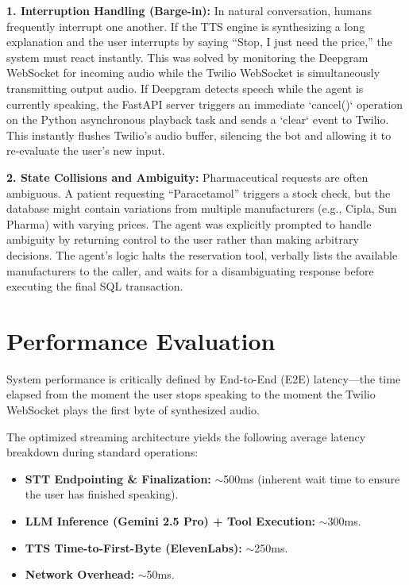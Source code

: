 \documentclass[conference,a4paper]{IEEEtran}
\begin{document}
\textbf{1. Interruption Handling (Barge-in):} In natural conversation, humans frequently interrupt one another. If the TTS engine is synthesizing a long explanation and the user interrupts by saying ``Stop, I just need the price,'' the system must react instantly. This was solved by monitoring the Deepgram WebSocket for incoming audio while the Twilio WebSocket is simultaneously transmitting output audio. If Deepgram detects speech while the agent is currently speaking, the FastAPI server triggers an immediate `cancel()` operation on the Python asynchronous playback task and sends a `clear` event to Twilio. This instantly flushes Twilio's audio buffer, silencing the bot and allowing it to re-evaluate the user's new input.

\textbf{2. State Collisions and Ambiguity:} Pharmaceutical requests are often ambiguous. A patient requesting ``Paracetamol'' triggers a stock check, but the database might contain variations from multiple manufacturers (e.g., Cipla, Sun Pharma) with varying prices. The agent was explicitly prompted to handle ambiguity by returning control to the user rather than making arbitrary decisions. The agent's logic halts the reservation tool, verbally lists the available manufacturers to the caller, and waits for a disambiguating response before executing the final SQL transaction.

\section{Performance Evaluation}

System performance is critically defined by End-to-End (E2E) latency—the time elapsed from the moment the user stops speaking to the moment the Twilio WebSocket plays the first byte of synthesized audio. 

The optimized streaming architecture yields the following average latency breakdown during standard operations:
\begin{itemize}
    \item \textbf{STT Endpointing \& Finalization:} $\sim$500ms (inherent wait time to ensure the user has finished speaking).
    \item \textbf{LLM Inference (Gemini 2.5 Pro) + Tool Execution:} $\sim$300ms.
    \item \textbf{TTS Time-to-First-Byte (ElevenLabs):} $\sim$250ms.
    \item \textbf{Network Overhead:} $\sim$50ms.
\end{itemize}
\end{document}
